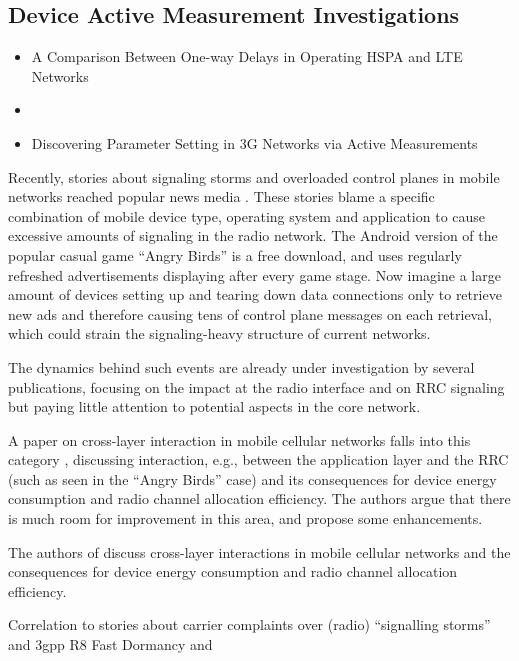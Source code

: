 \subsection{Device Active Measurement Investigations}

\begin{itemize}
	\item A Comparison Between One-way Delays in Operating HSPA and LTE Networks \cite{laner2012delaycomparison}
	\item \item Discovering Parameter Setting in 3G Networks via Active Measurements \cite{4640935}
\end{itemize}

Recently, stories about signaling storms and overloaded control planes in mobile networks reached popular news media \cite{it2011birdandroid, lt2012docostorm}. These stories blame a specific combination of mobile device type, operating system and application to cause excessive amounts of signaling in the radio network. The Android version of the popular casual game ``Angry Birds'' is a free download, and uses regularly refreshed advertisements displaying after every game stage. Now imagine a large amount of devices setting up and tearing down data connections only to retrieve new ads and therefore causing tens of control plane messages on each retrieval, which could strain the signaling-heavy structure of current networks. 

The dynamics behind such events are already under investigation by several publications, focusing on the impact at the radio interface and on \gls{RRC} signaling but paying little attention to potential aspects in the core network. 


A paper on cross-layer interaction in mobile cellular networks falls into this category \cite{qian2011profiling}, discussing interaction, e.g., between the application layer and the \gls{RRC} (such as seen in the ``Angry Birds'' case) and its consequences for device energy consumption and radio channel allocation efficiency. The authors argue that there is much room for improvement in this area, and propose some enhancements.

The authors of \cite{qian2011profiling} discuss cross-layer interactions in mobile cellular networks and the consequences for device energy consumption and radio channel allocation efficiency.


Correlation to stories about carrier complaints over (radio) ``signalling storms''  and 3gpp R8 Fast Dormancy \cite{3gpp.25.331} and \cite{gsma2011fdbestpract}



